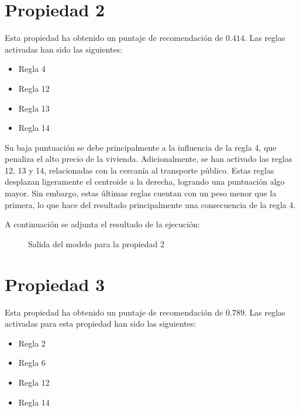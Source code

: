 \documentclass[12pt]{report} %
\begin{document}
    \section{Propiedad 2}
    
    Esta propiedad ha obtenido un puntaje de recomendación de $0.414$. Las reglas activadas han sido las siguientes: 
    \begin{itemize}
        \item Regla 4
        \item Regla 12
        \item Regla 13
        \item Regla 14
    \end{itemize}
    Su baja puntuación se debe principalmente a la influencia de la regla 4,
    que penaliza el alto precio de la vivienda. Adicionalmente, se han activado
    las reglas 12, 13 y 14, relacionadas con la cercanía al transporte público.
    Estas reglas desplazan ligeramente el centroide a la derecha, logrando una
    puntuación algo mayor. Sin embargo, estas últimas reglas cuentan con un
    peso menor que la primera, lo que hace del resultado
    principalmente una consecuencia de la regla 4.

    A continuación se adjunta el resultado de la ejecución:
    \begin{figure}[H]
        \centering
        \caption{Salida del modelo para la propiedad 2}
    \end{figure}

    \section{Propiedad 3}
    Esta propiedad ha obtenido un puntaje de recomendación de $0.789$. Las reglas activadas para esta propiedad han sido las siguientes: 
    \begin{itemize}
        \item Regla 2
        \item Regla 6
        \item Regla 12
        \item Regla 14
    \end{itemize}
\end{document}
